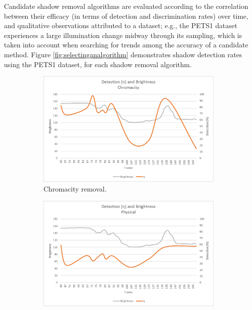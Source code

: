 Candidate shadow removal algorithms are evaluated according to the correlation between their efficacy (in terms of detection and discrimination rates) over time, and qualitative observations attributed to a dataset; e.g., the PETS1 dataset experiences a large illumination change midway through its sampling, which is taken into account when searching for trends among the accuracy of a candidate method. Figure \ref{fig:selectinganalgorithm} demonstrates shadow detection rates using the PETS1 dataset, for each shadow removal algorithm.

\begin{figure}
\centering

\begin{subfigure}{.32\linewidth}
  \includegraphics[width=1\linewidth]{figures/selectinganalgorithm_chromacity.jpg}
  \caption{Chromacity removal.}
\end{subfigure}
\hfill
\begin{subfigure}{.32\linewidth}
  \includegraphics[width=1\linewidth]{figures/selectinganalgorithm_physical.jpg}

\end{subfigure}
\end{figure}
